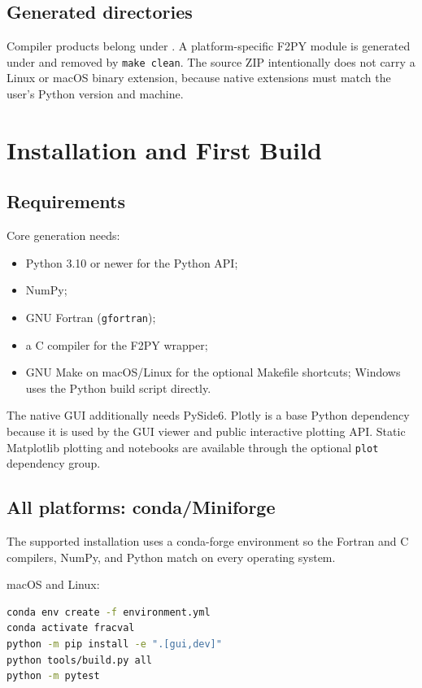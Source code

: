 \documentclass[11pt,oneside]{report}
\newcommand{\code}[1]{\texttt{#1}}
\begin{document}
\section{Generated directories}

Compiler products belong under . A platform-specific F2PY module
is generated under  and removed by \code{make clean}.
The source ZIP intentionally does not carry a Linux or macOS binary extension,
because native extensions must match the user's Python version and machine.

\chapter{Installation and First Build}

\section{Requirements}

Core generation needs:
\begin{itemize}
  \item Python 3.10 or newer for the Python API;
  \item NumPy;
  \item GNU Fortran (\code{gfortran});
  \item a C compiler for the F2PY wrapper;
  \item GNU Make on macOS/Linux for the optional Makefile shortcuts; Windows uses the Python build script directly.
\end{itemize}

The native GUI additionally needs PySide6. Plotly is a base Python dependency
because it is used by the GUI viewer and public interactive plotting API.
Static Matplotlib plotting and notebooks are available through the optional
\code{plot} dependency group.

\section{All platforms: conda/Miniforge}

The supported installation uses a conda-forge environment so the Fortran and C
compilers, NumPy, and Python match on every operating system.

macOS and Linux:
\begin{lstlisting}[language=bash]
conda env create -f environment.yml
conda activate fracval
python -m pip install -e ".[gui,dev]"
python tools/build.py all
python -m pytest
\end{lstlisting}
\end{document}
